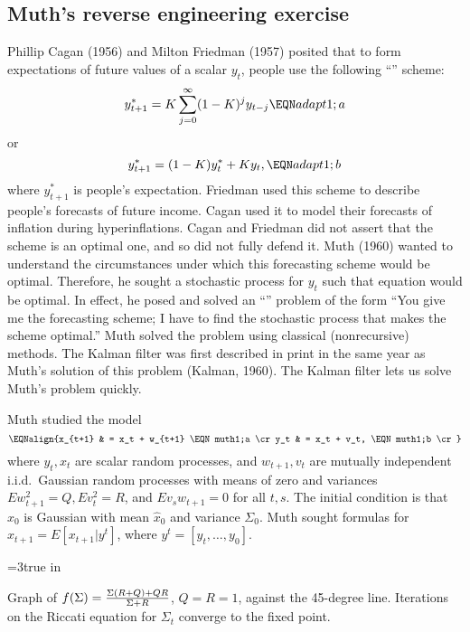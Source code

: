 \subsection{Muth's reverse engineering exercise}\label{sec:Muth_reverse}%
  Phillip Cagan  (1956) and Milton Friedman  (1957)
posited that to form
expectations of future values of a
scalar $y_t$, people use the following ``''
scheme:
$$ y_{t+1}^* = K \sum_{j=0}^\infty (1-K)^j y_{t-j} \EQN adapt1;a $$
or
$$ y_{t+1}^*  = (1-K) y_t^* + K y_t , \EQN adapt1;b$$
where $y_{t+1}^*$ is people's expectation.    Friedman
used this scheme to describe people's forecasts of future
income.  Cagan used it to model their forecasts of inflation
during hyperinflations. Cagan and Friedman did not assert that
the scheme is an optimal one, and so did not fully defend it.
Muth (1960) wanted to understand the circumstances under which
this forecasting  scheme  would be optimal.  Therefore,
he sought a stochastic process for $y_t$ such that equation 
would be optimal.  In effect, he posed and solved an
``'' problem of the form  ``You give me
the forecasting scheme; I have to find the stochastic process
that makes the scheme optimal.''
Muth solved the problem using classical (nonrecursive) methods.
    The Kalman
filter  was first described in print in the same year as Muth's  solution
of this problem (Kalman, 1960).  The Kalman filter lets  us solve Muth's problem quickly.
%
%
%
%
%

Muth studied the model
$$\EQNalign{x_{t+1} & = x_t + w_{t+1} \EQN muth1;a \cr
            y_t & = x_t + v_t, \EQN muth1;b \cr}$$
where  $y_t, x_t$ are scalar random processes,
and $w_{t+1}, v_t$ are mutually independent
i.i.d.\ Gaussian random processes with means of zero and
variances $E w_{t+1}^2 = Q, E v_t^2 =R$, and  $Ev_s w_{t+1} = 0$
for all $t,s$.  The initial condition
is that $x_0$ is Gaussian with mean $\hat x_0$ and
variance $\Sigma_0$. Muth sought formulas for
$\hat x_{t+1} = E [x_{t+1} \vert y^t]$, where
$y^t = [y_t, \ldots, y_0]$.



\centerline{\epsfxsize=3true in}
\caption{Graph of $f(\Sigma) = {
 {\Sigma(R+Q) + Q R} \over \Sigma + R }$, $Q= R=1$, against the 45-degree
line. Iterations on the Riccati equation for $\Sigma_t$ converge
to the fixed point.}
\endfigure




